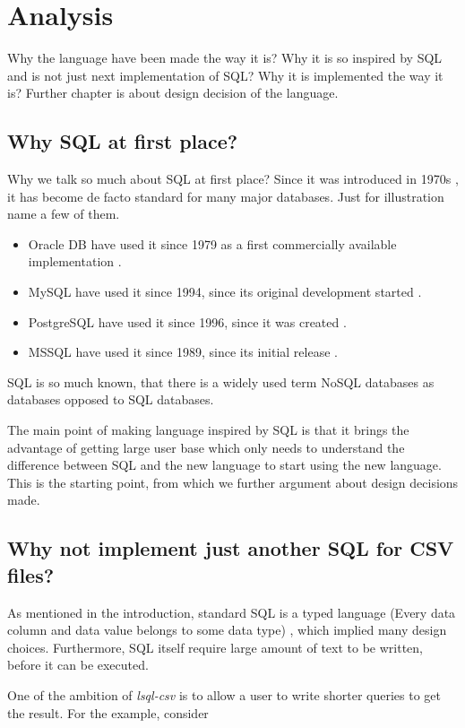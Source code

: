 \chapter{Analysis}
Why the language have been made the way it is? Why it is so inspired by SQL and is not just next implementation of SQL?
Why it is implemented the way it is?
Further chapter is about design decision of the language.


\section{Why SQL at first place?}
Why we talk so much about SQL at first place? Since it was introduced in 1970s \cite{enwiki-sql}, it has
become de facto standard for many major databases. Just for illustration name a few of them.
\begin{itemize}
    \item Oracle DB have used it since 1979 as a first commercially available implementation \cite{oracle-db-sql}. 
    \item MySQL have used it since 1994, since its original development started \cite{enwiki-mysql}.
    \item PostgreSQL have used it since 1996, since it was created \cite{postgres-birthday}. 
    \item MSSQL have used it since 1989, since its initial release \cite{enwiki-mssql}. 
\end{itemize}

SQL is so much known, that there is a widely used term NoSQL databases as databases opposed to SQL databases.

The main point of making language inspired by SQL is that it brings the advantage of getting large user base which only needs to understand the difference between SQL and the new language to start using the new language. This is the starting point, from which we further argument about design decisions made.


\section{Why not implement just another SQL for CSV files?}
As mentioned in the introduction, standard SQL is a typed language (Every data column and data value belongs to some data type) \cite{ISO9075-2023}, 
which implied many design choices. Furthermore, SQL itself require large amount of text to be written,
before it can be executed. 

One of the ambition of \textit{lsql-csv} is to allow a user to write shorter queries to get the result. For the example,
consider

